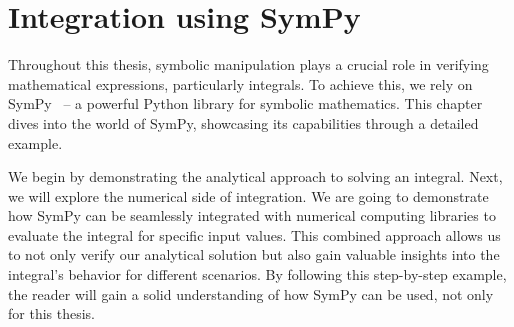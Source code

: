 \chapter{Integration using SymPy}\label{ch:integration-using-sympy}

Throughout this thesis,
symbolic manipulation plays a crucial role in verifying mathematical expressions,
particularly integrals.
To achieve this,
we rely on SymPy~\autocite{10.7717/peerj-cs.103} --
a powerful Python library for symbolic mathematics.
This chapter dives into the world of SymPy,
showcasing its capabilities through a detailed example.

We begin by demonstrating the analytical approach to solving an integral.
Next, we will explore the numerical side of integration.
We are going to demonstrate how SymPy can be seamlessly integrated with numerical computing libraries
to evaluate the integral for specific input values.
This combined approach allows us to not only verify our analytical solution
but also gain valuable insights into the integral's behavior for different scenarios.
By following this step-by-step example,
the reader will gain a solid understanding of how SymPy can be used,
not only for this thesis.





